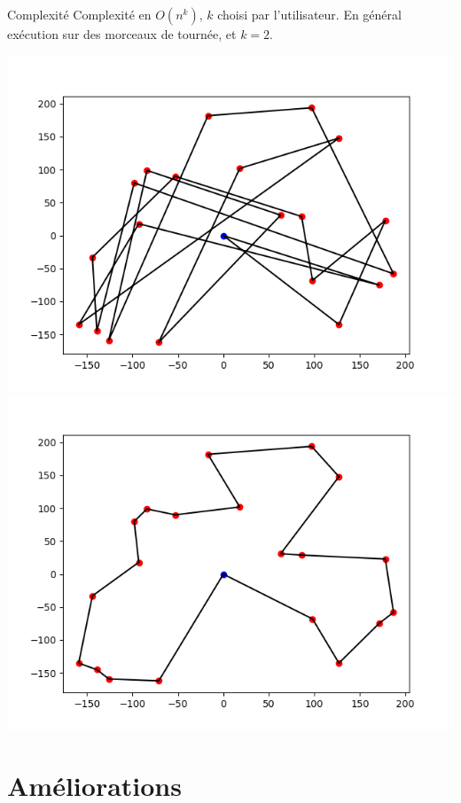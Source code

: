\documentclass{beamer}
\begin{document}
\begin{frame}
\begin{alertblock}{Complexité}
Complexité en $O(n^k)$, $k$ choisi par l'utilisateur. En général exécution sur des morceaux de tournée, et $k=2$.
\end{alertblock}

\begin{center}
\includegraphics[scale=0.32]{test4_20_init.png}
\includegraphics[scale=0.32]{test4_20_LKopt.png}
\end{center}

\end{frame}


\section{Améliorations}
\end{document}
